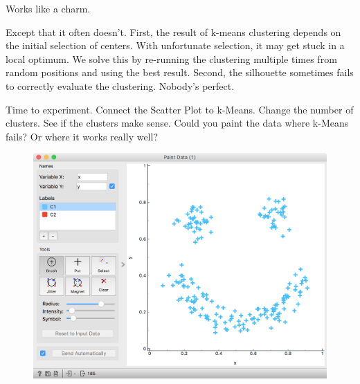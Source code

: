 \newpage

Works like a charm.

Except that it often doesn't. First, the result of k-means clustering depends on the initial selection of centers. With unfortunate selection, it may get stuck in a local optimum. We solve this by re-running the clustering multiple times from random positions and using the best result. Second, the silhouette sometimes fails to correctly evaluate the clustering. Nobody's perfect.

Time to experiment. Connect the Scatter Plot to k-Means. Change the number of clusters. See if the clusters make sense. Could you paint the data where k-Means fails? Or where it works really well?

\begin{figure}[h]
    \centering
    \includegraphics[width=\linewidth]{smiley-face.png}
    \caption{$\;$} %
\end{figure}
